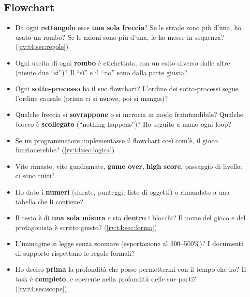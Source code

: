 \subsection{Flowchart}
\begin{itemize}
  \item Da ogni \textbf{rettangolo} esce \textbf{una sola freccia}? Se le
        strade sono più d'una, ho usato un rombo? Se le azioni sono più
        d'una, le ho messe in sequenza? (\ref{rv:t4:sec:regole})
  \item Ogni uscita di ogni \textbf{rombo} è etichettata, con un esito
        diverso dalle altre (niente due ``sì'')? Il ``sì'' e il ``no'' sono
        dalla parte giusta?
  \item Ogni \textbf{sotto-processo} ha il suo flowchart? L'ordine dei
        sotto-processi segue l'ordine causale (prima ci si muove, poi si
        mangia)?
  \item Qualche freccia si \textbf{sovrappone} o si incrocia in modo
        fraintendibile? Qualche blocco è \textbf{scollegato} (``nothing
        happens'')? Ho seguito a mano ogni loop?
  \item Se un programmatore implementasse il flowchart così com'è, il gioco
        funzionerebbe? (\ref{rv:t4:sec:logica})
  \item Vite rimaste, vite guadagnate, \textbf{game over}, \textbf{high
        score}, passaggio di livello: ci sono tutti?
  \item Ho dato i \textbf{numeri} (durate, punteggi, liste di oggetti) o
        rimandato a una tabella che li contiene?
  \item Il testo è di \textbf{una sola misura} e sta \textbf{dentro} i
        blocchi? Il nome del gioco e del protagonista è scritto giusto?
        (\ref{rv:t4:sec:forma})
  \item L'immagine si legge senza zoomare (esportazione al 300--500\%)? I
        documenti di supporto rispettano le regole formali?
  \item Ho deciso \textbf{prima} la profondità che posso permettermi con il
        tempo che ho? Il task è \textbf{completo}, e coerente nella profondità
        delle sue parti? (\ref{rv:t4:sec:scope})
\end{itemize}

